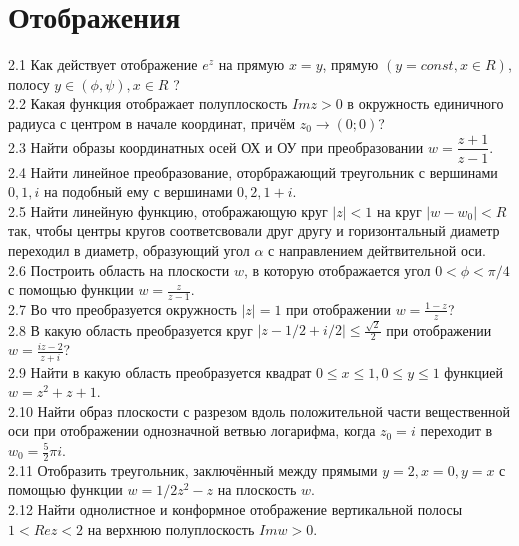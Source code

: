 \documentclass{article}
\begin{document}
\section{Отображения}
2.1 Как действует отображение $e^z$ на прямую $x=y$, прямую $(y=const, x\in R)$, полосу $y\in(\phi, \psi), x\in R$ ?\\
2.2 Какая функция отображает полуплоскость $Im z > 0$ в окружность единичного радиуса с центром в начале координат, причём $z_0 \rightarrow (0; 0)$? \\
2.3 Найти образы координатных осей ОХ и ОУ при преобразовании $w= \dfrac{z+1}{z-1}$.\\
2.4 Найти линейное преобразование, оторбражающий треугольник с вершинами $0, 1, i$  на подобный ему с вершинами $0, 2, 1+i$.\\
2.5 Найти линейную функцию, отображающую круг $\vert z \vert < 1$  на круг $\vert w - w_0 \vert < R$ так, чтобы центры кругов соответсвовали друг другу и горизонтальный диаметр переходил в диаметр, образующий угол $\alpha$ с направлением дейтвительной оси.\\
2.6 Построить область на плоскости $w$, в которую отображается угол $0<\phi<\pi/4$ с помощью функции $w=\frac{z}{z-1}$.\\
2.7 Во что преобразуется окружность $\vert z \vert =1 $ при отображении $w=\frac{1-z}{z}$?\\
2.8 В какую область преобразуется круг $\vert z - 1/2 +i/2\vert\leq\frac{\sqrt{2}}{2}$ при отображении $w=\frac{iz-2}{z+i}$?\\
2.9 Найти в какую область преобразуется квадрат $0\leq x \leq1, 0\leq y \leq1$ функцией $w=z^2+z+1$.\\
2.10 Найти образ плоскости с разрезом вдоль положительной части вещественной оси при отображении однозначной ветвью логарифма, когда $z_0=i$ переходит в $w_0=\frac{5}{2}\pi i$.\\
2.11 Отобразить треугольник, заключённый между прямыми $y=2, x=0, y=x$ с помощью функции $w=1/2z^2-z$ на плоскость $w$.\\
2.12 Найти однолистное и конформное отображение вертикальной полосы $1 < Re z < 2$  на верхнюю полуплоскость $Im w > 0$.\\
\end{document}

